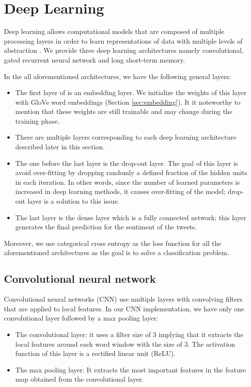 \documentclass[8pt,conference,compsocconf]{IEEEtran}
\begin{document}
\section{Deep Learning} \label{sec:deeplearning}
Deep learning allows computational models that are composed of multiple processing layers in order to learn representations of data with multiple levels of abstraction \cite{deeplearning}. We provide three deep learning architectures namely convolutional, gated recurrent neural network and long short-term memory. 

In the all aforementioned architectures, we have the following general layers:
\begin{itemize}
	\item The first layer of is an embedding layer. We initialize the weights of this layer with GloVe word embeddings (Section \ref{sec:embedding}). It it noteworthy to mention that these weights are still trainable and may change during the training phase.
	\item There are multiple layers corresponding to each deep learning architecture described later in this section.
	\item The one before the last layer is the drop-out layer. The goal of this layer is avoid over-fitting by dropping randomly a defined fraction of the hidden units in each iteration. In other words, since the number of learned parameters is increased in deep learning methods, it causes over-fitting of the model; drop-out layer is a solution to this issue. 
	\item The last layer is the dense layer which is a fully connected network; this layer generates the final prediction for the sentiment of the tweets. 
\end{itemize}
Moreover, we use categorical cross entropy as the loss function for all the aforementioned architectures as the goal is to solve a classification problem.

\subsection{Convolutional neural network}\label{sec:conv}
Convolutional neural networks (CNN) use multiple layers with convolving filters that are applied to local features. In our CNN implementation, we have only one convolutional layer followed by a max pooling layer:
\begin{itemize}
	\item The convolutional layer: it uses a filter size of $3$ implying that it extracts the local features around each word window with the size of $3$. The activation function of this layer is a rectified linear unit (ReLU). 
	\item The max pooling layer: It extracts the most important features in the feature map obtained from the convolutional layer.
\end{itemize}
\end{document}
